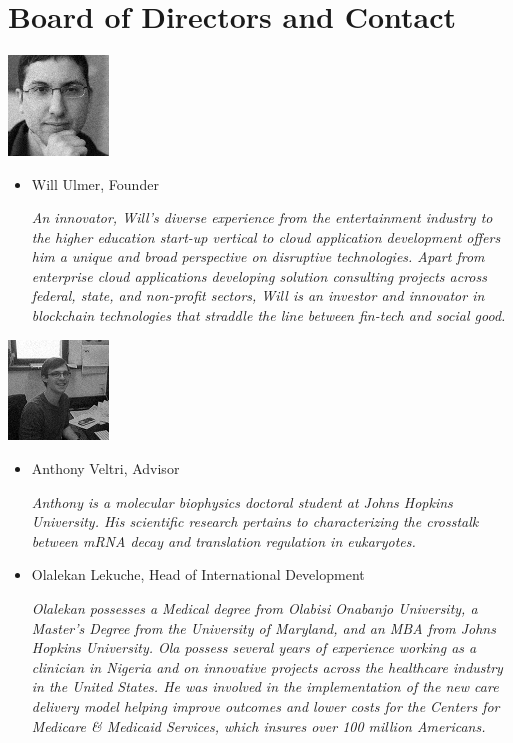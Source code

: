 \documentclass[11pt]{article}
\begin{document}
\section{Board of Directors and Contact}
\label{sec-7-1}

\begin{center}
\includegraphics[width=0.2\textwidth]{will.jpg}
\end{center}

\begin{itemize}
\item{Will Ulmer, Founder

\textit{An innovator, Will's diverse experience from the entertainment industry to the higher education start-up vertical to cloud application development offers him a unique and broad perspective on disruptive technologies. Apart from enterprise cloud applications developing solution consulting projects across federal, state, and non-profit sectors, Will is an investor and innovator in blockchain technologies that straddle the line between fin-tech and social good.}}
\end{itemize}

\begin{center}
\includegraphics[width=0.2\textwidth]{anthony.jpg}
\end{center}

\begin{itemize}
\item{Anthony Veltri, Advisor

\textit{Anthony is a molecular biophysics doctoral student at Johns Hopkins University. His scientific research pertains to characterizing the crosstalk between mRNA decay and translation regulation in eukaryotes.}
}
\end{itemize}

\begin{itemize}
\item{Olalekan Lekuche, Head of International Development

\textit{Olalekan possesses a Medical degree from Olabisi Onabanjo University, a Master’s Degree from the University of Maryland, and an MBA from Johns Hopkins University. Ola possess several years of experience working as a clinician in Nigeria and on innovative projects across the healthcare industry in the United States. He was involved in the implementation of the new care delivery model helping improve outcomes and lower costs for the Centers for Medicare \& Medicaid Services, which insures over 100 million Americans.}
}
\end{itemize}
\end{document}
